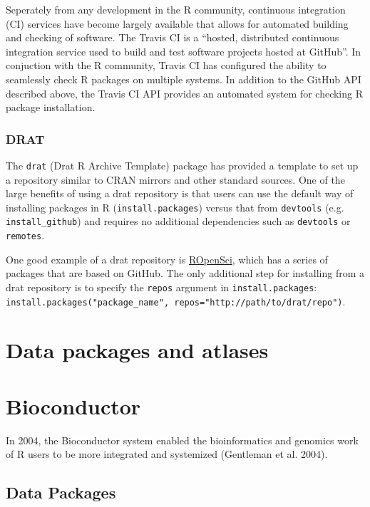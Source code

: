 \documentclass[]{elsarticle} %
\begin{document}
Seperately from any development in the R community, continuous
integration (CI) services have become largely available that allows for
automated building and checking of software. The Travis CI is a
``hosted, distributed continuous integration service used to build and
test software projects hosted at GitHub''. In conjuction with the R
community, Travis CI has configured the ability to seamlessly check R
packages on multiple systems. In addition to the GitHub API described
above, the Travis CI API provides an automated system for checking R
package installation.

\subsubsection{DRAT}\label{drat}

The \texttt{drat} (Drat R Archive Template) package has provided a
template to set up a repository similar to CRAN mirrors and other
standard sources. One of the large benefits of using a drat repository
is that users can use the default way of installing packages in R
(\texttt{install.packages}) versus that from \texttt{devtools} (e.g.
\texttt{install\_github}) and requires no additional dependencies such
as \texttt{devtools} or \texttt{remotes}.

One good example of a drat repository is
\href{https://ropensci.org/}{ROpenSci}, which has a series of packages
that are based on GitHub. The only additional step for installing from a
drat repository is to specify the \texttt{repos} argument in
\texttt{install.packages}:
\texttt{install.packages("package\_name",\ repos="http://path/to/drat/repo")}.

\section{Data packages and atlases}\label{datapackages}

\section{Bioconductor}\label{bioconductor}

In 2004, the Bioconductor system enabled the bioinformatics and genomics
work of R users to be more integrated and systemized (Gentleman et al.
2004).

\subsection{Data Packages}\label{data-packages}
\end{document}
